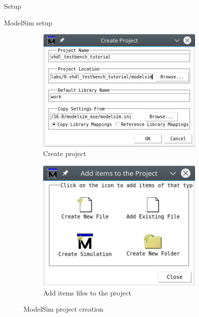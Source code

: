 \documentclass[lab]{course}
\begin{document}
\begin{section}{Setup}
\begin{subsection}{ModelSim setup}
\begin{enumerate}
                \begin{figure}[!h]
                    \centering
                    \begin{subfigure}[t]{0.45\textwidth}
                        \centering
                        \includegraphics[width=0.9\textwidth]{figs/create_project.png}
                        \caption{Create project}
                        \label{fig:create_project}
                    \end{subfigure}
                    \hspace{1em}
                    \begin{subfigure}[t]{0.40\textwidth}
                        \centering
                        \includegraphics[width=0.9\textwidth]{figs/add_files_to_project.png}
                        \caption{Add items files to the project}
                        \label{fig:add_files_to_project}
                    \end{subfigure}
                    \caption{ModelSim project creation}
                \end{figure}


\end{enumerate}
\end{subsection}
\end{section}
\end{document}
